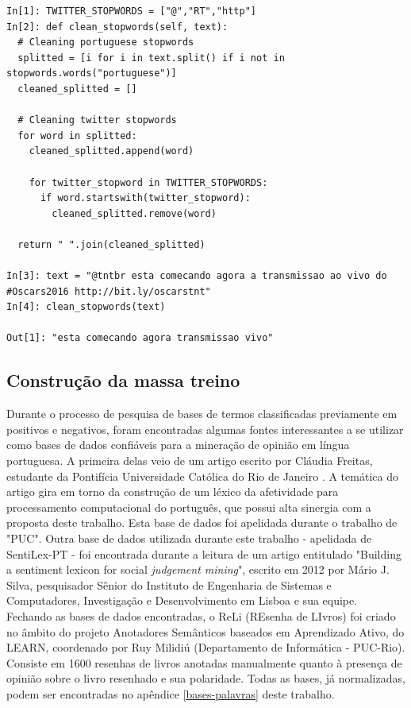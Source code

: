 \begin{lstlisting}[style=python, frame=single]
In[1]: TWITTER_STOPWORDS = ["@","RT","http"]
In[2]: def clean_stopwords(self, text):
  # Cleaning portuguese stopwords
  splitted = [i for i in text.split() if i not in stopwords.words("portuguese")]
  cleaned_splitted = []

  # Cleaning twitter stopwords
  for word in splitted:
    cleaned_splitted.append(word)

    for twitter_stopword in TWITTER_STOPWORDS:
      if word.startswith(twitter_stopword):
        cleaned_splitted.remove(word)

  return " ".join(cleaned_splitted)

In[3]: text = "@tntbr esta comecando agora a transmissao ao vivo do #Oscars2016 http://bit.ly/oscarstnt"
In[4]: clean_stopwords(text)

Out[1]: "esta comecando agora transmissao vivo"

\end{lstlisting}



\subsection{Construção da massa treino}
Durante o processo de pesquisa de bases de termos classificadas previamente em positivos e negativos, foram encontradas algumas fontes interessantes a se utilizar como bases de dados confiáveis para a mineração de opinião em língua portuguesa.
A primeira delas veio de um artigo escrito por Cláudia Freitas, estudante da Pontifícia Universidade Católica do Rio de Janeiro \cite{freitas2013construccao}. A temática do artigo gira em torno da construção de um léxico da afetividade para processamento computacional do português, que possui alta sinergia com a proposta deste trabalho. Esta base de dados foi apelidada durante o trabalho de "PUC".
Outra base de dados utilizada durante este trabalho - apelidada de SentiLex-PT - foi encontrada durante a leitura de um artigo entitulado "Building a sentiment lexicon for social \textit{judgement mining}"\cite{marioj.silvapaulacarvalholuissarmento2012}, escrito em 2012 por Mário J. Silva, pesquisador Sênior do Instituto de Engenharia de Sistemas e Computadores, Investigação e Desenvolvimento em Lisboa e sua equipe. 
Fechando as bases de dados encontradas, o ReLi (REsenha de LIvros) foi criado no âmbito do projeto Anotadores Semânticos baseados em Aprendizado Ativo, do LEARN, coordenado por Ruy Milidiú (Departamento de Informática - PUC-Rio). Consiste em 1600 resenhas de livros anotadas manualmente quanto à presença de opinião sobre o livro resenhado e sua polaridade\cite{reli-resenha-livros}.
Todas as bases, já normalizadas, podem ser encontradas no apêndice \ref{bases-palavras} deste trabalho. 

